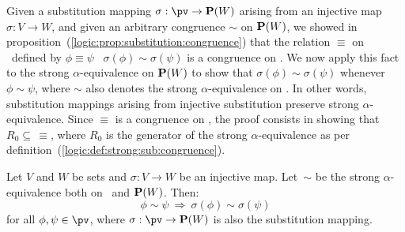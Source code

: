 Given a substitution mapping $\sigma:\pv\to{\bf P}(W)$ arising from
an injective map $\sigma:V\to W$, and given an arbitrary congruence
$\sim$ on ${\bf P}(W)$, we showed in
proposition~(\ref{logic:prop:substitution:congruence}) that the
relation $\equiv$ on \pv\ defined by $\phi\equiv\psi$ \ifand\
$\sigma(\phi)\sim\sigma(\psi)$ is a congruence on \pv. We now apply
this fact to the strong $\alpha$-equivalence on ${\bf P}(W)$ to
show that $\sigma(\phi)\sim\sigma(\psi)$ whenever
$\phi\sim\psi$, where $\sim$ also denotes the strong $\alpha$-equivalence
on \pv. In other words, substitution mappings arising
from injective substitution preserve strong $\alpha$-equivalence. 
Since $\equiv$ is a congruence on \pv, the
proof consists in showing that $R_{0}\subseteq\,\equiv$,
where $R_{0}$ is the generator of the strong $\alpha$-equivalence
as per definition~(\ref{logic:def:strong:sub:congruence}).

\begin{prop}\label{logic:prop:strong:injective:substitution}
Let $V$ and $W$ be sets and $\sigma:V\to W$ be an injective map.
Let~$\sim$ be the strong $\alpha$-equivalence both on \pv\ and
${\bf P}(W)$. Then:
    \[
    \phi\sim\psi\ \Rightarrow\ \sigma(\phi)\sim\sigma(\psi)
    \]
for all $\phi,\psi\in\pv$, where $\sigma:\pv\to{\bf P}(W)$ is also
the substitution mapping.
\end{prop}

